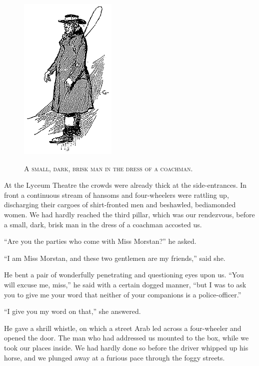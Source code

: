 \documentclass[12pt,english,oneside]{book}
\newcommand{\noun}[1]{\textsc{#1}}
\begin{document}
%
\begin{figure}[htbp]
\noindent \begin{center}\includegraphics{images/sign410-sign-04.png}\end{center}

\noindent \begin{center}\noun{A small, dark, brisk man in the dress
of a coachman.}\end{center}
\end{figure}
At the Lyceum Theatre the crowds were already thick at the side-entrances.
In front a continuous stream of hansoms and four-wheelers were rattling
up, discharging their cargoes of shirt-fronted men and beshawled,
bediamonded women. We had hardly reached the third pillar, which was
our rendezvous, before a small, dark, brisk man in the dress of a
coachman accosted us.

{}``Are you the parties who come with Miss Morstan?'' he asked.

{}``I am Miss Morstan, and these two gentlemen are my friends,''
said she.

He bent a pair of wonderfully penetrating and questioning eyes upon
us. {}``You will excuse me, miss,'' he said with a certain dogged
manner, {}``but I was to ask you to give me your word that neither
of your companions is a police-officer.''

{}``I give you my word on that,'' she answered.

He gave a shrill whistle, on which a street Arab led across a four-wheeler
and opened the door. The man who had addressed us mounted to the box,
while we took our places inside. We had hardly done so before the
driver whipped up his horse, and we plunged away at a furious pace
through the foggy streets.
\end{document}

